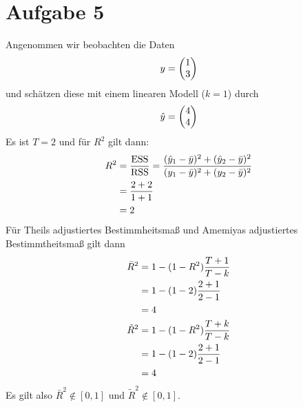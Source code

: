 \documentclass{article}
\begin{document}
	\section*{Aufgabe 5}
	Angenommen wir beobachten die Daten
	\begin{align}
		y = \begin{pmatrix}
			1 \\ 3
		\end{pmatrix} \notag
	\end{align}
	und schätzen diese mit einem linearen Modell ($k=1$) durch
	\begin{align}
		\hat{y} = \begin{pmatrix}
			4 \\ 4
		\end{pmatrix} \notag
	\end{align}
	Es ist $T=2$ und für $R^2$ gilt dann:
	\begin{align}
		R^2 &= \frac{\text{ESS}}{\text{RSS}} = \frac{(\hat{y}_1 - \bar{y})^2 + (\hat{y}_2 - \bar{y})^2}{(y_1-\bar{y})^2 + (y_2-\bar{y})^2} \notag \\
		&= \frac{2+2}{1+1} \notag \\
		&= 2 \notag
	\end{align}
	Für Theils adjustiertes Bestimmheitsmaß und Amemiyas adjustiertes Bestimmtheitsmaß gilt dann
	\begin{align}
		\bar{R}^2 &=1- (1-R^2)\frac{T+1}{T-k} \notag \\
		&= 1-(1-2)\frac{2+1}{2-1} \notag \\
		&= 4 \notag \\
		\tilde{R}^2 &= 1- (1-R^2)\frac{T+k}{T-k} \notag \\
		&= 1-(1-2)\frac{2+1}{2-1} \notag \\
		&= 4 \notag
	\end{align}
	Es gilt also $\bar{R}^2\notin [0,1]$ und $\tilde{R}^2\notin [0,1]$.
	
\end{document}
